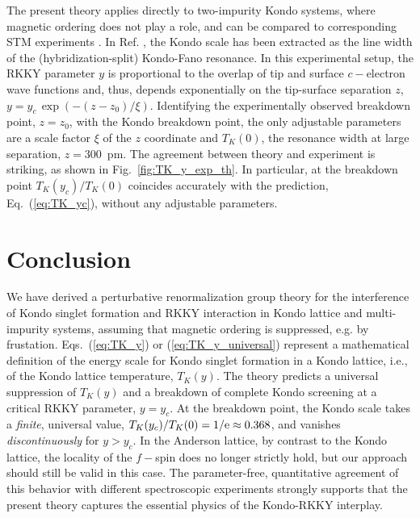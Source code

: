 \documentclass[12pt,twoside]{article}
\newcommand{\Eq}[1]{Eq.~(\ref{#1})}
\begin{document}
The present theory applies directly to two-impurity 
Kondo systems, where magnetic ordering does not play a role, 
and can be compared to corresponding STM experiments 
\cite{Bork11,Kroeger11}. 
In Ref. \cite{Bork11}, the Kondo scale has been extracted as the 
line width of the (hybridization-split) Kondo-Fano resonance. In this 
experimental setup, the RKKY parameter $y$ is proportional to the 
overlap of tip and surface $c-$electron wave functions and, thus,
depends exponentially on the tip-surface separation $z$, 
$y=y_c\,\exp(-(z-z_0)/\xi)$. Identifying the experimentally observed
breakdown point, $z=z_0$, with the Kondo breakdown point, 
the only adjustable parameters are a scale factor $\xi$ of the $z$ coordinate
and $T_K(0)$, the resonance width at large separation, $z=300$~pm. 
The agreement between theory and experiment is striking, as shown in
Fig.~\ref{fig:TK_y_exp_th}. In particular, at the breakdown point
$T_K(y_c)/T_K(0)$ coincides accurately with the prediction, 
\Eq{eq:TK_yc}, without any adjustable parameters. 



\section{Conclusion}
\label{sec:conclusion}

We have derived a perturbative renormalization group theory 
for the interference of Kondo singlet formation and 
RKKY interaction in Kondo lattice and multi-impurity systems,
assuming that magnetic ordering is suppressed, e.g. by frustation. 
Eqs.~(\ref{eq:TK_y}) or (\ref{eq:TK_y_universal}) represent a mathematical 
definition of the energy scale for Kondo singlet formation in a Kondo lattice,
i.e., of the Kondo lattice temperature, $T_K(y)$.
The theory predicts a universal suppression of $T_K(y)$ and a breakdown of 
complete Kondo screening at a critical RKKY parameter, $y=y_c$. 
At the breakdown point, the Kondo scale takes a {\it finite}, universal value,
$T_K(y_c)/T_K(0)=1/{\rm e}\approx 0.368$, and vanishes 
{\it discontinuously} for $y>y_c$. 
In the Anderson lattice, by contrast to the Kondo lattice, the locality 
of the $f-$spin does no longer strictly hold, but our approach should 
still be valid in this case. The parameter-free, quantitative agreement 
of this behavior with different spectroscopic experiments 
\cite{Bork11,Kroeger11} strongly supports that the present theory 
captures the essential physics of the Kondo-RKKY interplay. 
\end{document}

